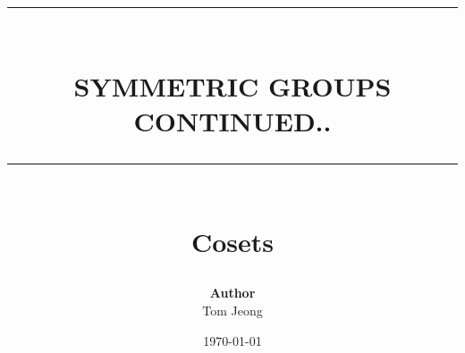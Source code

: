 \documentclass{article}
\newcommand{\HRule}[1]{\rule{\linewidth}{#1}}
\begin{document}

\title{ \normalsize \textsc{}
		\\ [2.0cm]
		\HRule{1.5pt} \\
		\LARGE \textbf{\uppercase{Symmetric Groups continued..}}
		\HRule{2.0pt} \\ [0.6cm] \LARGE{Cosets}
		}

\date{\today}
\author{\textbf{Author} \\ 
		Tom Jeong
        }

\maketitle
\newpage

\tableofcontents
\newpage

\end{document}
